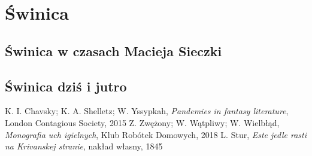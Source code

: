 \documentclass[11pt, onecolumn, twoside]{report}
\begin{document}
\chapter{Świnica}
\label{sw}

\section{Świnica w czasach Macieja Sieczki}

\section{Świnica dziś i jutro}

\newpage
\begin{thebibliography}{3}
K. I. Chavsky; K. A. Shelletz; W. Yssypkah, \textit{Pandemies in fantasy literature}, London Contagious Society, 2015
Z. Zwężony; W. Wątpliwy; W. Wielbłąd, \textit{Monografia uch igielnych}, Klub Robótek Domowych, 2018
L. Stur, \textit{Este jedle rasti na Krivanskej stranie}, nakład własny, 1845
\end{thebibliography}
\end{document}

